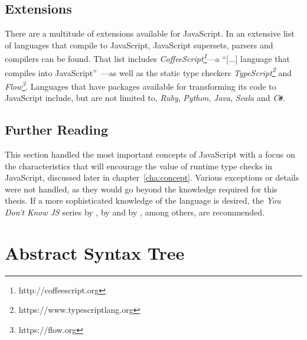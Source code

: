

\subsection{Extensions}
\label{sec:javascript-extensions}

There are a multitude of extensions available for JavaScript. In \cite{LanguagesThatCompileToJS:CoffeeScript:2017} an extensive list of languages that compile to JavaScript, JavaScript supersets, parsers and compilers can be found. That list includes \emph{CoffeeScript\footnote{http://coffeescript.org}}---a ``[...] language that compiles into JavaScript''~\cite{CoffeeScript}---as well as the static type checkers \emph{TypeScript\footnote{https://www.typescriptlang.org}} and \emph{Flow\footnote{https://flow.org}}. Languages that have packages available for transforming its code to JavaScript include, but are not limited to, \emph{Ruby}, \emph{Python}, \emph{Java}, \emph{Scala} and \emph{C\texttt{\#}}.

\subsection{Further Reading}
\label{sec:further reading}


This section handled the most important concepts of JavaScript with a focus on the characteristics that will encourage the value of runtime type checks in JavaScript, discussed later in chapter~\ref{cha:concept}. Various exceptions or details were not handled, as they would go beyond the knowledge required for this thesis. If a more sophisticated knowledge of the language is desired, the \emph{You Don't Know JS} series by \citeauthor{YDKJS:UpAndGoing:Simpson:2015}, \emph{\emph{}} by \citeauthor{JavaScriptTheGoodParts:Crockford:2008} and \emph{\emph{}} by \citeauthor{JavaScriptTheDefinitiveGuide:Flanagan:2011}, among others, are recommended.

\section{Abstract Syntax Tree}
\label{sec:ast}

